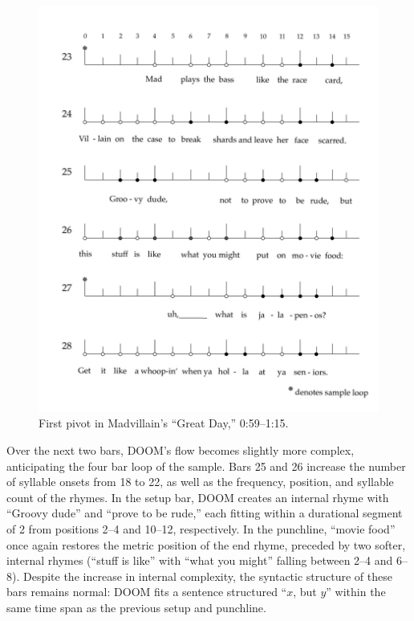     \begin{figure}[!ht]
        \centering
        \includegraphics{images/figures/chp 03/059115greatdayfirstpivot.pdf}
        \caption{First pivot in Madvillain's ``Great Day,'' 0:59--1:15.}
        \label{fig:doomfirstpiv}
    \end{figure}

Over the next two bars, DOOM's flow becomes slightly more complex, anticipating the four bar loop
of the sample. Bars 25 and 26 increase the number of syllable onsets from 18 to 22, as well as the 
frequency, position, and syllable count of the rhymes. In the setup bar, DOOM creates an internal 
rhyme with ``Groovy dude'' and ``prove to  be rude,'' each fitting within a durational segment of 2
from positions 2--4 and 10--12, respectively. In the punchline, ``movie food'' once again restores
the metric position of the end rhyme, preceded by two softer, internal rhymes (``stuff is like'' with
``what you might'' falling between 2--4 and 6--8). Despite the increase in internal complexity, the 
syntactic structure of these bars remains normal: DOOM fits a sentence structured ``$x$, but $y$'' 
within the same time span as the previous setup and punchline.

